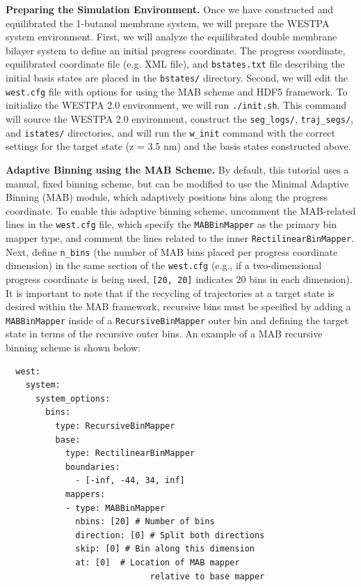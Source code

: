\textbf{Preparing the Simulation Environment.}  Once we have constructed and equilibrated the 1-butanol membrane system, we will prepare the WESTPA system environment. 
First, we will analyze the equilibrated double membrane bilayer system to define an initial progress coordinate. 
The progress coordinate, equilibrated coordinate file (e.g. XML file), and \verb|bstates.txt| file describing the initial basis states are placed in the \verb|bstates/| directory. 
Second, we will edit the \verb|west.cfg| file with options for using the MAB scheme and HDF5 framework. 
To initialize the WESTPA 2.0 environment, we will run \verb|./init.sh|. 
This command will source the WESTPA 2.0 environment, construct the \verb|seg_logs/|, \verb|traj_segs/|, and \verb|istates/| directories, and will run the \verb|w_init| command with the correct settings for the target state (z = 3.5 nm) and the basis states constructed above.

\textbf{Adaptive Binning using the MAB Scheme.} By default, this tutorial uses a manual, fixed binning scheme, but can be modified to use the Minimal Adaptive Binning (MAB) module, which adaptively positions bins along the progress coordinate. 
To enable this adaptive binning scheme, uncomment the MAB-related lines in the \verb|west.cfg| file, which specify the \verb|MABBinMapper| as the primary bin mapper type, and comment the lines related to the inner \verb|RectilinearBinMapper|. 
Next, define \verb|n_bins| (the number of MAB bins placed per progress coordinate dimension) in the same section of the \verb|west.cfg| (e.g., if a two-dimensional progress coordinate is being used, \verb|[20, 20]| indicates 20 bins in each dimension). 
It is important to note that if the recycling of trajectories at a target state is desired within the MAB framework, recursive bins must be specified by adding a \verb|MABBinMapper| inside of a \verb|RecursiveBinMapper| outer bin and defining the target state in terms of the recursive outer bins. 
An example of a MAB recursive binning scheme is shown below:

\newpage
\begin{verbatim}
  west:
    system:
      system_options:
        bins:
          type: RecursiveBinMapper
          base:
            type: RectilinearBinMapper
            boundaries:
              - [-inf, -44, 34, inf]
            mappers:
            - type: MABBinMapper
              nbins: [20] # Number of bins
              direction: [0] # Split both directions
              skip: [0] # Bin along this dimension
              at: [0]  # Location of MAB mapper
                             relative to base mapper
\end{verbatim}

